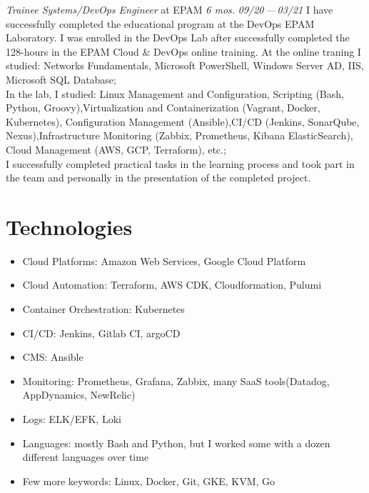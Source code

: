 \documentclass[11pt]{letter}
\newcommand{\forceindent}{\leavevmode{\parindent=1em\indent} %
}
\begin{document}
\begin{etaremune}[
  topsep=1ex,itemsep=1.5ex,partopsep=0ex,
  parsep=0ex,rightmargin=1em,leftmargin=2em
]
  \item
    \emph{Trainee Systems/DevOps Engineer}\hfill
    at EPAM\hspace{6.3em}
    \textit{6 mos.}\hspace{5em}
    \textit{09/20\,—\,03/21}\vspace{1em}\newline
    \forceindent I have successfully completed the educational program at the DevOps EPAM Laboratory. I was enrolled in the DevOps Lab after successfully completed the 128-hours in the EPAM Cloud \& DevOps online training. At the online traning I studied:
	Networks Fundamentals, Microsoft PowerShell, Windows Server AD, IIS, Microsoft SQL Database; \\

	\forceindent In the lab, I studied: Linux Management and Configuration, Scripting (Bash, Python, Groovy),Virtualization and Containerization (Vagrant, Docker, Kubernetes), Configuration Management (Ansible),CI/CD (Jenkins, SonarQube, Nexus),Infrastructure Monitoring (Zabbix, Prometheus, Kibana ElasticSearch), Cloud Management (AWS, GCP, Terraform), etc.; \\

	\forceindent I successfully completed practical tasks in the learning process and took part in the team and personally in the presentation of the completed project.\\
\end{etaremune}
\section*{Technologies\vphantom{tech}}

\begin{itemize}
  \item Cloud Platforms: Amazon Web Services, Google Cloud Platform
  \item Cloud Automation: Terraform, AWS CDK, Cloudformation, Pulumi
  \item Container Orchestration: Kubernetes
  \item CI/CD: Jenkins, Gitlab CI, argoCD
  \item CMS: Ansible
  \item Monitoring: Prometheus, Grafana, Zabbix, many SaaS tools(Datadog, AppDynamics, NewRelic)
  \item Logs: ELK/EFK, Loki
  \item Languages: mostly Bash and Python, but I worked some with a dozen different languages over time
  \item Few more keywords: Linux, Docker, Git, GKE, KVM, Go
\end{itemize}
\end{document}
